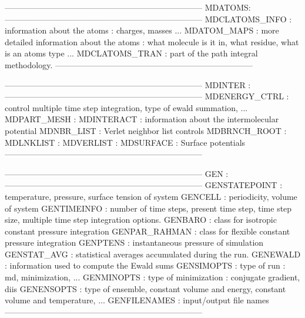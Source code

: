 ------------------------------------------------------------------------
MDATOMS:
------------------------------------------------------------------------
MDCLATOMS_INFO : information about the atoms : charges, masses ...
MDATOM_MAPS    : more detailed information about the atoms : 
what molecule is it in, what residue, what is
an atoms type ...
MDCLATOMS_TRAN : part of the path integral methodology.
------------------------------------------------------------------------


------------------------------------------------------------------------
MDINTER :
------------------------------------------------------------------------
MDENERGY_CTRL  : control multiple time step integration,
               type of ewald summation, ...
               MDPART_MESH    : 
MDINTERACT     : information about the intermolecular potential
MDNBR_LIST     : Verlet neighbor list controls
MDBRNCH_ROOT :
MDLNKLIST    :
MDVERLIST    :
MDSURFACE      : Surface potentials
------------------------------------------------------------------------


------------------------------------------------------------------------
GEN :
------------------------------------------------------------------------
GENSTATEPOINT  : temperature, pressure, surface tension of system
GENCELL        : periodicity, volume of system
GENTIMEINFO    : number of time steps, present time step, time step size,
               multiple time step integration options.
               GENBARO        : class for isotropic constant pressure integration
               GENPAR_RAHMAN  : class for flexible constant pressure integration
                                      GENPTENS       : instantaneous pressure of simulation
                                                       GENSTAT_AVG    : statistical averages accumulated during the run.
                                                       GENEWALD       : information used to compute the Ewald sums
                                                       GENSIMOPTS     : type of run : md, minimization, ...
                                                       GENMINOPTS     : type of minimization : conjugate gradient, diis
                                                       GENENSOPTS     : type of ensemble, constant volume and energy,
                                                       constant volume and temperature, ...
                                                       GENFILENAMES   : input/output file names
                                                       ------------------------------------------------------------------------


